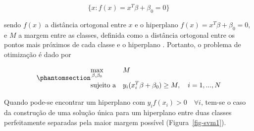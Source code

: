 \documentclass[
  12pt,
  twoside,
  openright,
  a4paper,
  chapter=TITLE,
  section=TITLE,
  brazil]{abntex2}
\begin{document}
\begin{apendicesenv}
\[
\{x: f(x) = x^T\beta + \beta_0 = 0\}
\]

\noindent sendo \(f(x)\) a distância ortogonal entre \(x\) e o
hiperplano \(f(x) = x^T\beta + \beta_0 = 0\), e \(M\) a margem entre as
classes, definida como a distância ortogonal entre os pontos mais
próximos de cada classe e o hiperplano \autocite{hastie_elements_2009}.
Portanto, o problema de otimização é dado por

\begin{equation}\phantomsection\label{eq-svm}{
\begin{aligned}
& \underset{\beta, \beta_0}{\text{max}}
& & M \\
& \text{sujeito a}
& & y_i(x_i^T\beta + \beta_0) \geq M, \quad i = 1, ..., N
\end{aligned}
}\end{equation}

Quando pode-se encontrar um hiperplano com
\(y_if(x_i) > 0 \quad \forall i\), tem-se o caso da construção de uma
solução única para um hiperplano entre duas classes perfeitamente
separadas pela maior margem possível (Figura~\ref{fig-svm1}).

\begin{figure}

\begin{minipage}{\linewidth}



\end{minipage}%
\newline
\begin{minipage}{\linewidth}

\end{minipage}
\end{figure}
\end{apendicesenv}
\end{document}
